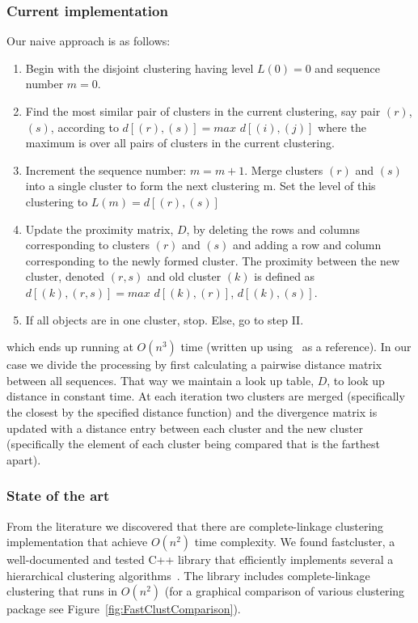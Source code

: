 \subsubsection*{Current implementation}
Our naive approach is as follows:
\begin{enumerate}[I]
\item Begin with the disjoint clustering having level $L(0) = 0$ and sequence number $m = 0$.
\item Find the most similar pair of clusters in the current clustering, say pair $(r)$, $(s)$, according to $d[(r),(s)] = max$ $d[(i),(j)]$ where the maximum is over all pairs of clusters in the current clustering.
\item Increment the sequence number: $m = m + 1$. Merge clusters $(r)$ and $(s)$ into a single cluster to form the next clustering m. Set the level of this clustering to $L(m) = d[(r),(s)]$
\item Update the proximity matrix, $D$, by deleting the rows and columns corresponding to clusters $(r)$ and $(s)$ and adding a row and column corresponding to the newly formed cluster. The proximity between the new cluster, denoted $(r,s)$ and old cluster $(k)$ is defined as $d[(k), (r,s)] = max$ $d[(k),(r)]$, $d[(k),(s)]$.
\item If all objects are in one cluster, stop. Else, go to step II.
\end{enumerate}
which ends up running at $O(n^3)$ time (written up using~\cite{wiki:xxx} as a reference).
In our case we divide the processing by first calculating a pairwise distance matrix between all sequences.
That way we maintain a look up table, $D$, to look up distance in constant time.
At each iteration two clusters are merged (specifically the closest by the specified distance function) and the divergence matrix is updated with a distance entry between each cluster and the new cluster (specifically the element of each cluster being compared that is the farthest apart).

\subsubsection*{State of the art}
From the literature we discovered that there are complete-linkage clustering implementation that achieve $O(n^2)$ time complexity.
We found fastcluster, a well-documented and tested C++ library that efficiently implements several a hierarchical clustering algorithms~\cite{mullner2011modern, FastClust}.
The library includes complete-linkage clustering that runs in $O(n^2)$ (for a graphical comparison of various clustering package see Figure~\ref{fig:FastClustComparison}).

